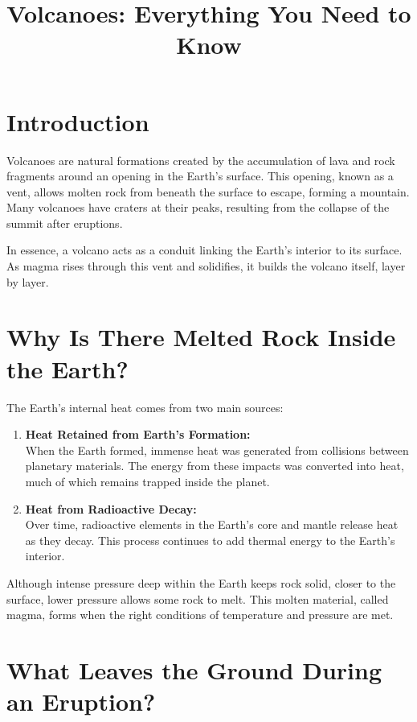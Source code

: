 \documentclass{article}
\title{Volcanoes: Everything You Need to Know}
\author{}
\date{}
\begin{document}
\maketitle

\section*{Introduction}

Volcanoes are natural formations created by the accumulation of lava and rock fragments around an opening in the Earth's surface. This opening, known as a vent, allows molten rock from beneath the surface to escape, forming a mountain. Many volcanoes have craters at their peaks, resulting from the collapse of the summit after eruptions.

In essence, a volcano acts as a conduit linking the Earth's interior to its surface. As magma rises through this vent and solidifies, it builds the volcano itself, layer by layer.

\section*{Why Is There Melted Rock Inside the Earth?}

The Earth's internal heat comes from two main sources:

\begin{enumerate}
    \item \textbf{Heat Retained from Earth's Formation:} \\
    When the Earth formed, immense heat was generated from collisions between planetary materials. The energy from these impacts was converted into heat, much of which remains trapped inside the planet.

    \item \textbf{Heat from Radioactive Decay:} \\
    Over time, radioactive elements in the Earth's core and mantle release heat as they decay. This process continues to add thermal energy to the Earth's interior.
\end{enumerate}

Although intense pressure deep within the Earth keeps rock solid, closer to the surface, lower pressure allows some rock to melt. This molten material, called magma, forms when the right conditions of temperature and pressure are met.

\section*{What Leaves the Ground During an Eruption?}
\end{document}
